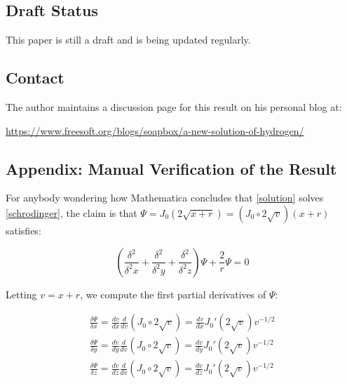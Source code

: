 \documentclass{article}
\begin{document}
\subsection*{Draft Status}

This paper is still a draft and is being updated regularly.

\subsection*{Contact}

The author maintains a discussion page for this result on his personal blog at:

\begin{center}
\small
\url{https://www.freesoft.org/blogs/soapbox/a-new-solution-of-hydrogen/}
\end{center}

\vfill\eject
\subsection*{Appendix: Manual Verification of the Result}
For anybody wondering how Mathematica concludes that \eqref{solution} solves \eqref{schrodinger},
the claim is that $\Psi = J_0(2\sqrt{x+r}) = (J_0 \circ 2\sqrt{v}) (x+r)$ satisfies:

\begin{equation}
\label{claim}
\left(\frac{\delta^2}{\delta^2 x} + \frac{\delta^2}{\delta^2 y} + \frac{\delta^2}{\delta^2 z}\right) \Psi + \frac{2}{r}\Psi = 0
\end{equation}

\vskip 12pt

Letting $v=x+r$, we compute the first partial derivatives of $\Psi$:

\begin{equation}
\begin{gathered}
\frac{\delta \Psi}{\delta x} = \frac{d v}{d x} \frac{d}{d v} \left(J_0 \circ 2\sqrt{v}\right) = \frac{d v}{d x} J_0'(2\sqrt{v}) v^{-1/2} \\
\frac{\delta \Psi}{\delta y} = \frac{d v}{d y} \frac{d}{d v} \left(J_0 \circ 2\sqrt{v}\right) = \frac{d v}{d y} J_0'(2\sqrt{v}) v^{-1/2} \\
\frac{\delta \Psi}{\delta z} = \frac{d v}{d z} \frac{d}{d v} \left(J_0 \circ 2\sqrt{v}\right) = \frac{d v}{d z} J_0'(2\sqrt{v}) v^{-1/2}
\end{gathered}
\end{equation}

\vskip 12pt
\end{document}

